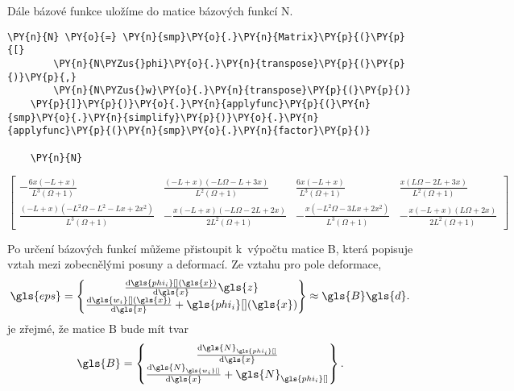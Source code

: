 \vspace{0.3cm}
Dále bázové funkce uložíme do matice bázových funkcí \gls{N}.   
    
\begin{tcolorbox}[breakable, size=fbox, boxrule=1pt, pad at break*=1mm,colback=cellbackground, colframe=cellborder]
    \begin{Verbatim}[commandchars=\\\{\}]
    \PY{n}{N} \PY{o}{=} \PY{n}{smp}\PY{o}{.}\PY{n}{Matrix}\PY{p}{(}\PY{p}{[}
        \PY{n}{N\PYZus{}phi}\PY{o}{.}\PY{n}{transpose}\PY{p}{(}\PY{p}{)}\PY{p}{,}
        \PY{n}{N\PYZus{}w}\PY{o}{.}\PY{n}{transpose}\PY{p}{(}\PY{p}{)}
    \PY{p}{]}\PY{p}{)}\PY{o}{.}\PY{n}{applyfunc}\PY{p}{(}\PY{n}{smp}\PY{o}{.}\PY{n}{simplify}\PY{p}{)}\PY{o}{.}\PY{n}{applyfunc}\PY{p}{(}\PY{n}{smp}\PY{o}{.}\PY{n}{factor}\PY{p}{)}
    
    \PY{n}{N}
    \end{Verbatim}
\end{tcolorbox}
     
                
    
    $\displaystyle \left[\begin{matrix}- \frac{6 x \left(- L + x\right)}{L^{3} \left(\Omega + 1\right)} & \frac{\left(- L + x\right) \left(- L \Omega - L + 3 x\right)}{L^{2} \left(\Omega + 1\right)} & \frac{6 x \left(- L + x\right)}{L^{3} \left(\Omega + 1\right)} & \frac{x \left(L \Omega - 2 L + 3 x\right)}{L^{2} \left(\Omega + 1\right)}\\\frac{\left(- L + x\right) \left(- L^{2} \Omega - L^{2} - L x + 2 x^{2}\right)}{L^{3} \left(\Omega + 1\right)} & - \frac{x \left(- L + x\right) \left(- L \Omega - 2 L + 2 x\right)}{2 L^{2} \left(\Omega + 1\right)} & - \frac{x \left(- L^{2} \Omega - 3 L x + 2 x^{2}\right)}{L^{3} \left(\Omega + 1\right)} & - \frac{x \left(- L + x\right) \left(L \Omega + 2 x\right)}{2 L^{2} \left(\Omega + 1\right)}\end{matrix}\right]$
    
\vspace{0.3cm}
Po určení bázových funkcí můžeme přistoupit k~výpočtu matice \gls{B}, která popisuje vztah mezi zobecnělými posuny a deformací. Ze vztahu pro pole deformace,
\begin{equation}
    \gls{eps}
    =
    \begin{Bmatrix}
        \dv{\gls{phi_i}[ ](\gls{x})}{\gls{x}} \gls{z} \\
        \dv{\gls{w_i}[ ](\gls{x})}{\gls{x}} + \gls{phi_i}[ ](\gls{x})
    \end{Bmatrix}
    \approx
    \gls{B}\gls{d}.
\end{equation}
je zřejmé, že matice \gls{B} bude mít tvar
\begin{equation}
    \gls{B}
    =
    \begin{Bmatrix}
        \dv{\gls{N}_{\gls{phi_i}[ ]}}{\gls{x}} \\
        \dv{\gls{N}_{\gls{w_i}[ ]}}{\gls{x}} + \gls{N}_{\gls{phi_i}[ ]}
    \end{Bmatrix}.
\end{equation}



